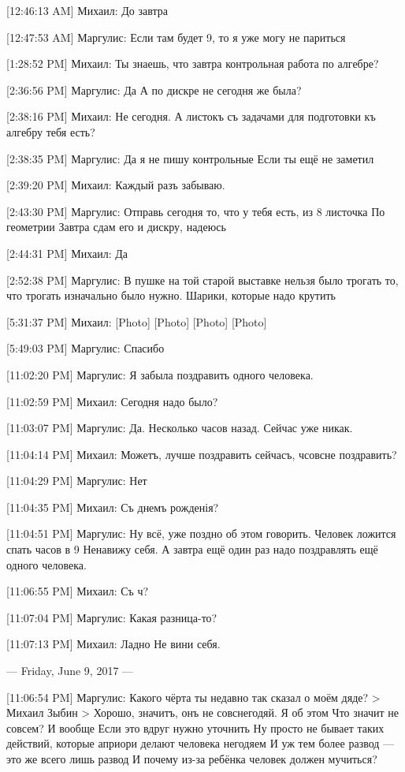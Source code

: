 \documentclass{article}
\newcommand{\yat}{{\fontencoding{X2}\selectfont\cyryat}} %
\begin{document}
[12:46:13 AM] Михаил:
До завтра

[12:47:53 AM] Маргулис:
Если там будет 9, то я уже могу не париться

[1:28:52 PM] Михаил:
Ты знаешь, что завтра контрольная работа по алгебре?

[2:36:56 PM] Маргулис:
Да
 А по дискре не сегодня же была?

[2:38:16 PM] Михаил:
Не сегодня. А листокъ съ задачами для подготовки къ алгебр\yat у тебя есть?

[2:38:35 PM] Маргулис:
Да я не пишу контрольные
 Если ты ещё не заметил

[2:39:20 PM] Михаил:
Каждый разъ забываю.

[2:43:30 PM] Маргулис:
Отправь сегодня то, что у тебя есть, из 8 листочка
 По геометрии
 Завтра сдам его и дискру, надеюсь

[2:44:31 PM] Михаил:
Да

[2:52:38 PM] Маргулис:
В пушке на той старой выставке нельзя было трогать то, что трогать изначально было нужно. Шарики, которые надо крутить

[5:31:37 PM] Михаил:
[Photo]
 [Photo]
 [Photo]
 [Photo]

[5:49:03 PM] Маргулис:
Спасибо

[11:02:20 PM] Маргулис:
Я забыла поздравить одного человека.

[11:02:59 PM] Михаил:
Сегодня надо было?

[11:03:07 PM] Маргулис:
Да.
 Несколько часов назад.
 Сейчас уже никак.

[11:04:14 PM] Михаил:
Можетъ, лучше поздравить сейчасъ, ч совс не поздравить?

[11:04:29 PM] Маргулис:
Нет

[11:04:35 PM] Михаил:
Съ днемъ рожденія?

[11:04:51 PM] Маргулис:
Ну всё, уже поздно об этом говорить.
 Человек ложится спать часов в 9
 Ненавижу себя.
 А завтра ещё один раз надо поздравлять ещё одного человека.

[11:06:55 PM] Михаил:
Съ ч?

[11:07:04 PM] Маргулис:
Какая разница-то?

[11:07:13 PM] Михаил:
Ладно
 Не вини себя.

--- Friday, June 9, 2017 ---

[11:06:54 PM] Маргулис:
Какого чёрта ты недавно так сказал о моём дяде?
> Михаил Зыбин
> Хорошо, значитъ, онъ не совс негодяй.
Я об этом
 Что значит не совсем?
 И вообще
 Если это вдруг нужно уточнить
 Ну просто не бывает таких действий, которые априори делают человека негодяем
 И уж тем более развод — это же всего лишь развод
 И почему из-за ребёнка человек должен мучиться?
\end{document}
